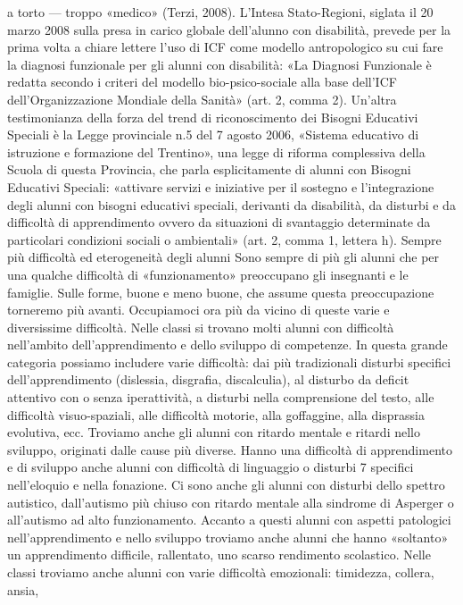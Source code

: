 a torto — troppo «medico» (Terzi, 2008).
L'Intesa Stato-Regioni, siglata il 20 marzo 2008 sulla presa in carico globale dell’alunno con
disabilità, prevede per la prima volta a chiare lettere l’uso di ICF come modello antropologico su
cui fare la diagnosi funzionale per gli alunni con disabilità: «La Diagnosi Funzionale è redatta
secondo i criteri del modello bio-psico-sociale alla base dell’ICF dell’Organizzazione Mondiale della
Sanità» (art. 2, comma 2).
Un'altra testimonianza della forza del trend di riconoscimento dei Bisogni Educativi Speciali è
la Legge provinciale n.5 del 7 agosto 2006, «Sistema educativo di istruzione e formazione del
Trentino», una legge di riforma complessiva della Scuola di questa Provincia, che parla
esplicitamente di alunni con Bisogni Educativi Speciali: «attivare servizi e iniziative per il sostegno e
l’integrazione degli alunni con bisogni educativi speciali, derivanti da disabilità, da disturbi e da
difficoltà di apprendimento ovvero da situazioni di svantaggio determinate da particolari condizioni
sociali o ambientali» (art. 2, comma 1, lettera h).
Sempre più difficoltà ed eterogeneità degli alunni
Sono sempre di più gli alunni che per una qualche difficoltà di «funzionamento» preoccupano
gli insegnanti e le famiglie. Sulle forme, buone e meno buone, che assume questa preoccupazione
torneremo più avanti. Occupiamoci ora più da vicino di queste varie e diversissime difficoltà.
Nelle classi si trovano molti alunni con difficoltà nell’ambito dell’apprendimento e dello
sviluppo di competenze. In questa grande categoria possiamo includere varie difficoltà: dai più
tradizionali disturbi specifici dell’apprendimento (dislessia, disgrafia, discalculia), al disturbo da
deficit attentivo con o senza iperattività, a disturbi nella comprensione del testo, alle difficoltà
visuo-spaziali, alle difficoltà motorie, alla goffaggine, alla disprassia evolutiva, ecc. Troviamo anche
gli alunni con ritardo mentale e ritardi nello sviluppo, originati dalle cause più diverse. Hanno una
difficoltà di apprendimento e di sviluppo anche alunni con difficoltà di linguaggio o disturbi
7
specifici nell’eloquio e nella fonazione. Ci sono anche gli alunni con disturbi dello spettro autistico,
dall’autismo più chiuso con ritardo mentale alla sindrome di Asperger o all’autismo ad alto
funzionamento. Accanto a questi alunni con aspetti patologici nell’apprendimento e nello sviluppo
troviamo anche alunni che hanno «soltanto» un apprendimento difficile, rallentato, uno scarso
rendimento scolastico.
Nelle classi troviamo anche alunni con varie difficoltà emozionali: timidezza, collera, ansia,
